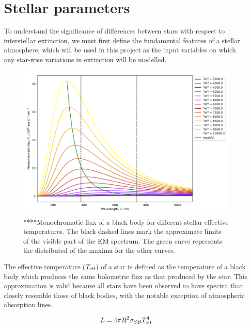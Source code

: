 \documentclass[12pt, a4paper]{report}
\begin{document}
\section{Stellar parameters}
To understand the significance of differences between stars with respect to interstellar extinction, we must first define the fundamental features of a stellar atmosphere, which will be used in this project as the input variables on which any star-wise variations in extinction will be modelled.

\begin{figure}[h]
\begin{center}
\includegraphics[scale=0.5]{blackbody_teff_illustration.pdf}
\caption{****Monochromatic flux of a black body for different stellar effective temperatures. The black dashed lines mark the approximate limits of the visible part of the EM spectrum. The green curve represents the distributed of the maxima for the other curves.}
\label{planck_curve}
\end{center}
\end{figure}

The effective temperature ($T_{\textnormal{eff}}$) of a star is defined as the temperature of a black body which produces the same bolometric flux as that produced by the star. This approximation is valid because all stars have been observed to have spectra that closely resemble those of black bodies, with the notable exception of atmospheric absorption lines.

\begin{equation}
L = 4 \pi R^{2} \sigma_{SB} T_{\textnormal{eff}}^{4}
\label{Teff_def}
\end{equation}
\end{document}
